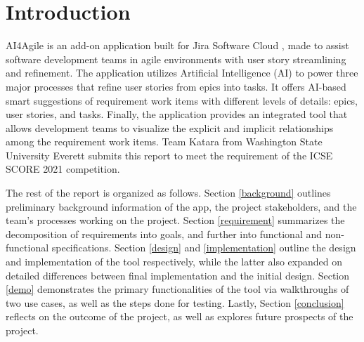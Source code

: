 \section{Introduction}
AI4Agile is an add-on application built for Jira Software Cloud \cite{jira2}, made to assist software development teams in agile environments with user story streamlining and refinement. The application utilizes Artificial Intelligence (AI) to power three major processes that refine user stories from epics into tasks. It offers AI-based smart suggestions of requirement work items with different levels of details: epics, user stories, and tasks. Finally, the application provides an integrated tool that allows development teams to visualize the explicit and implicit relationships among the requirement work items. Team Katara from Washington State University Everett submits this report to meet the requirement of the ICSE SCORE 2021 competition. 

The rest of the report is organized as follows. Section \ref{background} outlines preliminary background information of the app, the project stakeholders, and the team's processes working on the project. Section \ref{requirement} summarizes the decomposition of requirements into goals, and further into functional and non-functional specifications. Section \ref{design} and \ref{implementation} outline the design and implementation of the tool respectively, while the latter also expanded on detailed differences between final implementation and the initial design. Section \ref{demo} demonstrates the primary functionalities of the tool via walkthroughs of two use cases, as well as the steps done for testing. Lastly, Section 
\ref{conclusion} reflects on the outcome of the project, as well as explores future prospects of the project. 

